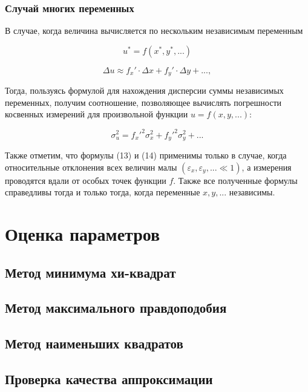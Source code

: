 \documentclass[12pt]{article}
\begin{document}
      \subsubsection{Случай многих переменных}

        В случае, когда величина вычисляется по нескольким независимым переменным

        $$
          u^* = f(x^*, y^*, ...)
        $$

        $$
          \Delta u \approx f_x' \cdot \Delta x + f_y' \cdot \Delta y + ...,
        $$

        Тогда, пользуясь формулой для нахождения дисперсии суммы независимых переменных,
        получим соотношение, позволяющее вычислять погрешности косвенных измерений
        для произвольной функции $u = f(x, y, ...)$:

        \begin{equation}
          \sigma_u^2 = f_x'^2 \sigma_x^2 + f_y'^2 \sigma_y^2 + ...
        \end{equation}

        Также отметим, что формулы (13) и (14) применимы только в случае, когда
        относительные отклонения всех величин малы $(\varepsilon_x, \varepsilon_y, ... \ll 1)$,
        а измерения проводятся вдали от особых точек функции $f$. Также все полученные
        формулы справедливы тогда и только тогда, когда переменные $x, y, ...$ независимы.

  \section{Оценка параметров}

    \subsection{Метод минимума хи-квадрат}

    \subsection{Метод максимального правдоподобия}

    \subsection{Метод наименьших квадратов}

    \subsection{Проверка качества аппроксимации}
\end{document}

